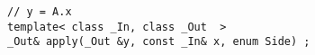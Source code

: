 {
\small
\begin{lstlisting}
// y = A.x
template< class _In, class _Out  >
_Out& apply(_Out &y, const _In& x, enum Side) ;
\end{lstlisting}
}
